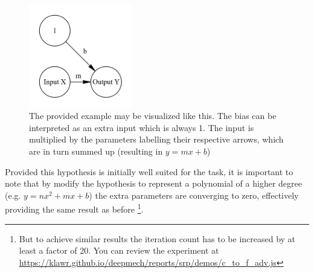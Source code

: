 \begin{figure}
    \centering
    \caption{ The provided example may be visualized like this.
        The bias can be interpreted as an extra input which is always 1.
        The input is multiplied by the parameters labelling their respective arrows, which are in turn summed up (resulting in $y = mx + b$) }
    \includegraphics[width=0.4\textwidth]{images/1_simplest_nn.png}
\end{figure} 

Provided this hypothesis is initially well suited for the task, it is important to note that by modify the hypothesis to represent a polynomial of a higher degree (e.g. $y = nx^2 + mx + b$) the extra parameters are converging to zero, effectively providing the same result as before
\footnote{But to achieve similar results the iteration count has to be increased by at least a factor of 20.
You can review the experiment at \url{https://klawr.github.io/deepmech/reports/srp/demos/c_to_f_adv.js}}.

